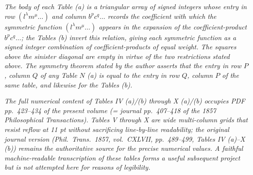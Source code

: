 \documentclass[11pt]{article}
\begin{document}
\medskip

\noindent\textit{The body of each Table (a) is a triangular array of signed integers whose entry in row $(l^\lambda m^\mu\ldots)$ and column $b^p c^q\ldots$ records the coefficient with which the symmetric function $(l^\lambda m^\mu\ldots)$ appears in the expansion of the coefficient-product $b^p c^q\ldots$; the Tables (b) invert this relation, giving each symmetric function as a signed integer combination of coefficient-products of equal weight. The squares above the sinister diagonal are empty in virtue of the two restrictions stated above. The symmetry theorem stated by the author asserts that the entry in row $P$, column $Q$ of any Table $N$ (a) is equal to the entry in row $Q$, column $P$ of the same table, and likewise for the Tables (b).}

\medskip

\noindent\textit{The full numerical content of Tables IV (a)/(b) through X (a)/(b) occupies PDF pp.~423--434 of the present volume (= journal pp.~407--418 of the 1857 Philosophical Transactions). Tables V through X are wide multi-column grids that resist reflow at 11 pt without sacrificing line-by-line readability; the original journal version (Phil.\ Trans.\ 1857, vol.\ CXLVII, pp.~489--499, Tables IV (a)--X (b)) remains the authoritative source for the precise numerical values. A faithful machine-readable transcription of these tables forms a useful subsequent project but is not attempted here for reasons of legibility.}
\end{document}
